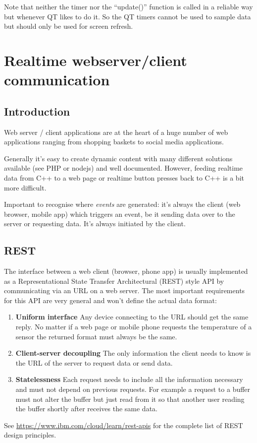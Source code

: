 \documentclass[12pt]{report}
\begin{document}
Note that neither the timer nor the ``update()'' function
is called in a reliable way but whenever QT likes to do it.
So the QT timers cannot be used to sample data but should
only be used for screen refresh.



\chapter{Realtime webserver/client communication}

\section{Introduction}

Web server / client applications are at the heart of a huge number
of web applications ranging from shopping baskets to social
media applications.

Generally it's easy to create dynamic content
with many different solutions available (see PHP or nodejs) and well
documented. However, feeding realtime data from C++ to a web page or
realtime button presses back to C++ is a bit more difficult.

Important to recognise where \textsl{events} are generated: it's
always the client (web browser, mobile app) which triggers an event,
be it sending data over to the server or requesting data. It's
always initiated by the client.

\section{REST}
The interface between a web client (browser, phone app) is usually
implemented as a Representational State Transfer Architectural (REST)
style API by communicating via an URL on a web server. The most important requirements
for this API are very general and won't define the actual data format:
\begin{enumerate}
\item\textbf{Uniform interface} Any device connecting to the URL should
  get the same reply. No matter if a web page or mobile phone
  requests the temperature of a sensor the returned format must always be the same.
\item\textbf{Client-server decoupling} The only information
  the client needs to know is the URL of the server to request data or send data.
\item\textbf{Statelessness} Each request needs to include all the
  information necessary and must not depend on previous requests. For
  example a request to a buffer must not alter the
  buffer but just read from it so that another user reading the buffer
  shortly after receives the same data.
\end{enumerate}
See \url{https://www.ibm.com/cloud/learn/rest-apis} for the complete
list of REST design principles.
\end{document}
